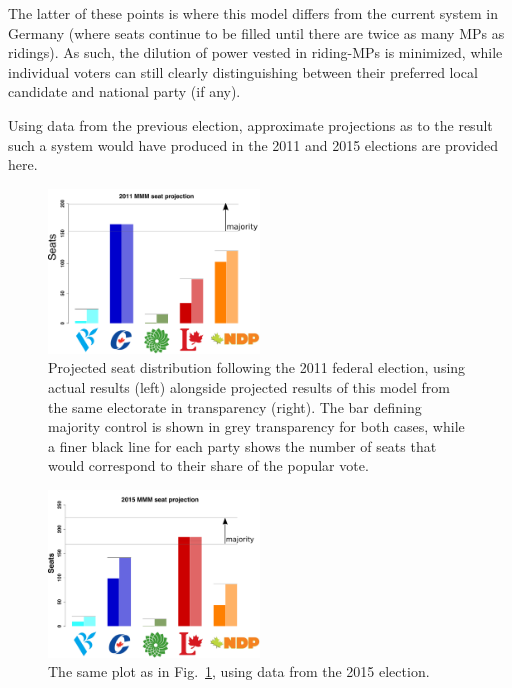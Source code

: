 \documentclass[DIV=calc, paper=a4, fontsize=11pt, twocolumn]{scrartcl}	 %
\begin{document}
The latter of these points is where this model differs from the current system in Germany (where seats continue to be filled until there are twice as many MPs as ridings). As such, the dilution of power vested in riding-MPs is minimized,  while individual voters can still  clearly distinguishing between their preferred local candidate and national party (if any).

Using data from the previous election, approximate projections as to the result such a system would have produced in the 2011 and 2015 elections are provided here.


\begin{figure}[h!]
  \includegraphics[width=0.50\textwidth,clip]{Figs/2011_seat_projection}
  \caption{Projected seat distribution following the 2011 federal election, using actual results (left) alongside projected results of this model from the same electorate in transparency (right). The bar defining majority control is shown in grey transparency for both cases, while a finer black line for each party shows the number of seats that would correspond to their share of the popular vote.
}
\label{fig:hypo_2011_sum}
\end{figure}


\begin{figure}[h!]
  \includegraphics[width=0.50\textwidth,clip]{Figs/2015_seat_projection}
  \caption{The same plot as in Fig.~\ref{fig:hypo_2011_sum}, using data from the 2015 election.}
\label{fig:hypo_2015_sum}
\end{figure}
\end{document}
